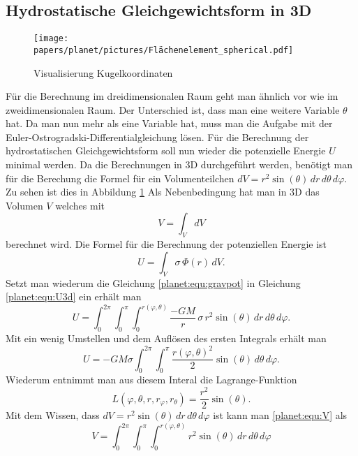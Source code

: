 \subsection{Hydrostatische Gleichgewichtsform in 3D}
\begin{figure}
	\centering
	\texttt{[image: papers/planet/pictures/Flächenelement\_spherical.pdf]}
	\caption{Visualisierung Kugelkoordinaten}
	\label{planet:fig:3d}
\end{figure}
Für die Berechnung im dreidimensionalen Raum geht man ähnlich vor wie im zweidimensionalen Raum.
Der Unterschied ist, dass man eine weitere Variable \(\theta\) hat.
Da man nun mehr als eine Variable hat, muss man die Aufgabe mit der Euler-Ostrogradski-Differentialgleichung lösen.
Für die Berechnung der hydrostatischen Gleichgewichtsform soll nun wieder die potenzielle Energie \(U\) minimal werden.
Da die Berechnungen in 3D durchgeführt werden, benötigt man für die Berechung die Formel für ein Volumenteilchen \(dV = r^2 \sin (\theta) \, dr \, d\theta \, d\varphi \).
Zu sehen ist dies in Abbildung \ref{planet:fig:3d}
Als Nebenbedingung hat man in 3D das Volumen \(V\) welches mit 
\begin{equation}
	V = \int_{V}^{} dV
	\label{planet:equ:V}
\end{equation}
berechnet wird.
Die Formel für die Berechnung der potenziellen Energie ist
\begin{equation}
	U = \int_{V} \sigma \,  \Phi (r)\, dV.
	\label{planet:equ:U3d}
\end{equation}
Setzt man wiederum die Gleichung \eqref{planet:equ:gravpot} in Gleichung \eqref{planet:equ:U3d} ein erhält man
\begin{equation*}
	U = \int_{0}^{2\pi}
	\int_{0}^{\pi}
	\int_{0}^{r(\varphi,\theta)}
	\frac{-GM}{r}\, \sigma\, r^2 \sin (\theta) \,
	dr \, d\theta \, d\varphi.
\end{equation*}
Mit ein wenig Umstellen und dem Auflösen des ersten Integrals erhält man
\begin{equation*}
	U =-GM\sigma \int_{0}^{2\pi}\int_{0}^{\pi}\frac{r(\varphi,\theta)^2}{2}  \sin (\theta) \, d\theta \, d\varphi.
\end{equation*}
Wiederum entnimmt man aus diesem Interal die Lagrange-Funktion
\begin{equation*}
	L(\varphi,\theta ,r,r_\varphi,r_\theta) = \frac{r^2}{2}  \sin (\theta).
\end{equation*}
Mit dem Wissen, dass \(dV = r^2 \sin (\theta) \, dr \, d\theta \, d\varphi \) ist kann man \eqref{planet:equ:V} als
\begin{equation*}
	V = \int_{0}^{2\pi}\int_{0}^{\pi}\int_{0}^{r(\varphi,\theta)} r^2 \sin (\theta) \, dr \, d\theta \, d\varphi
\end{equation*}
